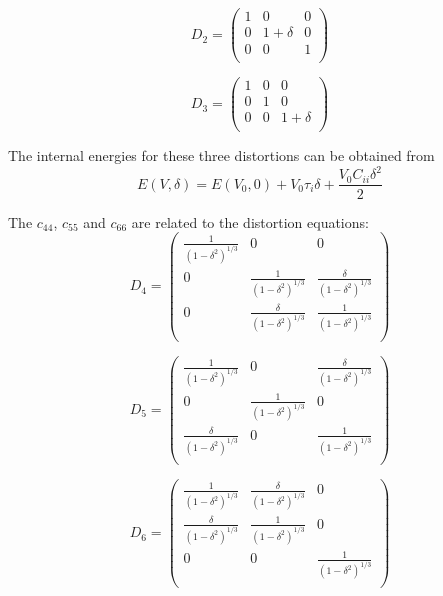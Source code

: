 \begin{appendices}
\begin{equation}
\label{eq_D2}
	D_2 = \begin{pmatrix}
						1 & 0 & 0 \\
						0 & 1+\delta & 0 \\
						0 & 0 & 1 \\
					\end{pmatrix}
\end{equation}

\begin{equation}
\label{eq_D3}
D_3 =  \begin{pmatrix}
						1 & 0 & 0 \\
						0 & 1 & 0 \\
						0 & 0 & 1+\delta \\
						\end{pmatrix}
\end{equation}

The internal energies for these three distortions can be obtained from 
\begin{equation}
\label{eq_d1d2d3}
E(V,\delta) = E(V_0,0) + V_0\tau_i \delta + \frac{V_0C_{ii}\delta^2}{2}
\end{equation}

The $c_{44}$, $c_{55}$ and $c_{66}$ are related to the distortion equations:
\begin{equation}
\label{eq_D4}
	D_4 = \begin{pmatrix}
						\frac{1}{(1-\delta^2)^{1/3}} & 0 & 0 \\
						0 & \frac{1}{(1-\delta^2)^{1/3}} & \frac{\delta}{(1-\delta^2)^{1/3}} \\
						0 & \frac{\delta}{(1-\delta^2)^{1/3}} & \frac{1}{(1-\delta^2)^{1/3}} \\
						\end{pmatrix}
\end{equation} 

\begin{equation}
\label{eq_D5}
	D_5 =  \begin{pmatrix}
						\frac{1}{(1-\delta^2)^{1/3}} & 0 & \frac{\delta}{(1-\delta^2)^{1/3}} \\
						0 & \frac{1}{(1-\delta^2)^{1/3}} & 0 \\
						\frac{\delta}{(1-\delta^2)^{1/3}} & 0 & \frac{1}{(1-\delta^2)^{1/3}} \\
						\end{pmatrix}
\end{equation}

\begin{equation}\label{eq_D6}
						D_6 = \begin{pmatrix}
						\frac{1}{(1-\delta^2)^{1/3}} & \frac{\delta}{(1-\delta^2)^{1/3}} & 0 \\
						\frac{\delta}{(1-\delta^2)^{1/3}} & \frac{1}{(1-\delta^2)^{1/3}} & 0 \\
						0 & 0 & \frac{1}{(1-\delta^2)^{1/3}} \\
						\end{pmatrix}
\end{equation}	



\end{appendices}

